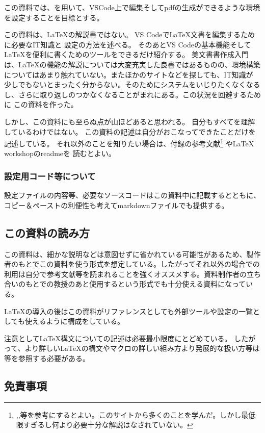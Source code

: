 \documentclass[titlepage]{ltjsarticle}
\begin{document}
この資料では、\LuaLaTeX を用いて、VSCode上で編集そしてpdfの生成ができるような環境を設定することを目標とする。

この資料は、\LaTeX の解説書ではない。
VS Codeで\LaTeX 文書を編集するために必要なIT知識と
設定の方法を述べる。
そのあとVS Codeの基本機能そしてLaTeXを便利に書くためのツールをできるだけ紹介する。
美文書書作成入門\cite{美文書本}は、\LaTeX の機能の解説については大変充実した良書ではあるものの、環境構築についてはあまり触れていない。またほかのサイトなどを探しても、IT知識が
少しでもないとまったく分からない。そのためにシステムをいじりたくなくなるし、さらに取り返しのつかなくなることがまれにある。この状況を回避するために
この資料を作った。

しかし、この資料にも至らぬ点が山ほどあると思われる。
自分もすべてを理解しているわけではない。
この資料の記述は自分がおこなってできたことだけを記述している。
それ以外のことを知りたい場合は、付録の参考文献\footnote{\cite{完全導入ガイド},\cite{最高の環境latex},\cite{platex}等を参考にするとよい。このサイトから多くのことを学んだ。しかし最低限すぎるし何より必要十分な解説はなされていない。}
やLaTeX workshopのreadme\cite{LaTeXworkshop_README}を
読むとよい。

\subsubsection{設定用コード等について}
設定ファイルの内容等、必要なソースコードはこの資料中に記載するとともに、コピー＆ペーストの利便性も考えてmarkdownファイルでも提供する。


\subsection{この資料の読み方}
この資料は、細かな説明などは意図せずに省かれている可能性があるため、製作者のもとでこの資料を使う形式を想定している。したがってそれ以外の場合での利用は自分で参考文献等を読まれることを強くオススメする。資料制作者の立ち合いのもとでの教授のあと使用するという形式でも十分使える資料になっている。

\LaTeX の導入の後はこの資料がリファレンスとしても外部ツールや設定の一覧としても使えるように構成をしている。

注意として\LaTeX 構文についての記述は必要最小限度にとどめている。
したがって、より詳しい\LaTeX の構文やマクロの詳しい組み方より発展的な扱い方等は\cite{美文書本}\cite{一週間基礎}等を参照する必要がある。

\subsection{免責事項}
\end{document}
